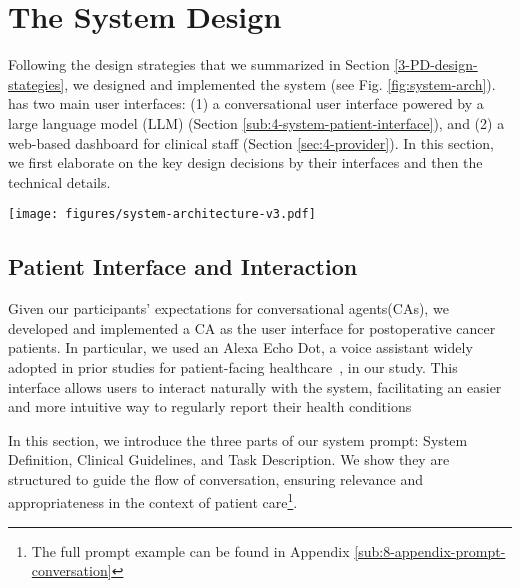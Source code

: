 \section{The \projectname System Design}
\label{sec:4-system-design}

Following the design strategies that we summarized in Section \ref{3-PD-design-stategies}, we designed and implemented the \projectname system (see Fig. \ref{fig:system-arch}). \projectname has two main user interfaces: (1) a conversational user interface powered by a large language model (LLM) (Section \ref{sub:4-system-patient-interface}), and (2) a web-based dashboard for clinical staff (Section \ref{sec:4-provider}). In this section, we first elaborate on the key design decisions by their interfaces and then the technical details.
\begin{figure*}[ht]
    \centering
    \texttt{[image: figures/system-architecture-v3.pdf]}
    \captionsetup{justification=centerlast}
    \caption{System architecture of \projectname. The red, purple, and blue arrows represent data generated by the Conversation Module, Information Extraction Module, and Summarization Module, respectively.
    }
    \label{fig:system-arch}
\end{figure*}

\subsection{Patient Interface and Interaction}
\label{subsub:4-system-patient-interface-prompt}
\label{sub:4-system-patient-interface}

Given our participants' expectations for conversational agents(CAs), we developed and implemented a CA as the user interface for postoperative cancer patients. In particular, we used an Alexa Echo Dot, a voice assistant widely adopted in prior studies for patient-facing healthcare~\cite{chanMangoMangoHow2023,mahmoodLLMPoweredConversationalVoice2023}, in our study.
This interface allows users to interact naturally with the system, facilitating an easier and more intuitive way to regularly report their health conditions 

In this section, we introduce the three parts of our system prompt: System Definition, Clinical Guidelines, and Task Description. We show  they are structured to guide the flow of conversation, ensuring relevance and appropriateness in the context of patient care\footnote{The full prompt example can be found in Appendix \ref{sub:8-appendix-prompt-conversation}}.

